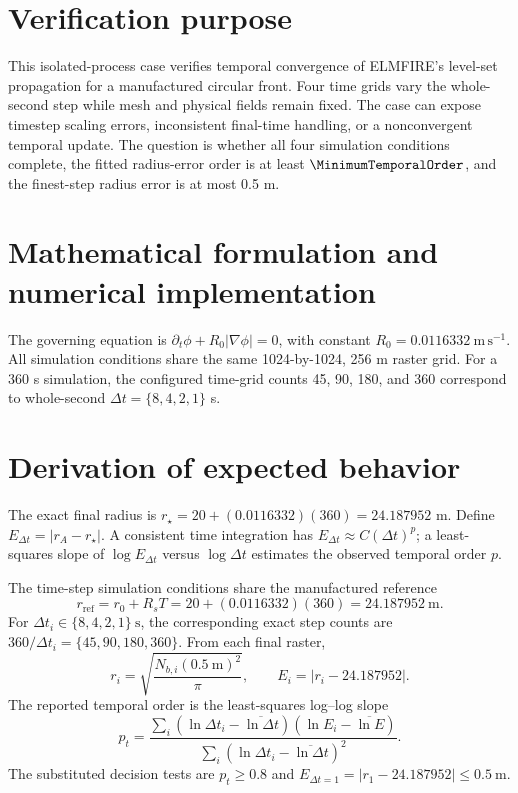 \section{Verification purpose}

This isolated-process case verifies temporal convergence of ELMFIRE's level-set propagation for a manufactured circular front. Four time grids vary the whole-second step while mesh and physical fields remain fixed. The case can expose timestep scaling errors, inconsistent final-time handling, or a nonconvergent temporal update. The question is whether all four simulation conditions complete, the fitted radius-error order is at least \(\MinimumTemporalOrder\), and the finest-step radius error is at most 0.5 m.

\section{Mathematical formulation and numerical implementation}

The governing equation is \(\partial_t\phi+R_0|\nabla\phi|=0\), with constant \(R_0=0.0116332~\mathrm{m\,s^{-1}}\). All simulation conditions share the same 1024-by-1024, 256 m raster grid. For a 360 s simulation, the configured time-grid counts 45, 90, 180, and 360 correspond to whole-second \(\Delta t=\{8,4,2,1\}\) s.

\section{Derivation of expected behavior}

The exact final radius is \(r_\star=20+(0.0116332)(360)=24.187952\) m. Define \(E_{\Delta t}=|r_A-r_\star|\). A consistent time integration has \(E_{\Delta t}\approx C(\Delta t)^p\); a least-squares slope of \(\log E_{\Delta t}\) versus \(\log\Delta t\) estimates the observed temporal order \(p\).

The time-step simulation conditions share the manufactured reference
\[
 r_{\mathrm{ref}}=r_0+R_sT
 =20+(0.0116332)(360)=24.187952~\mathrm{m}.
\]
For \(\Delta t_i\in\{8,4,2,1\}~\mathrm{s}\), the corresponding exact step
counts are \(360/\Delta t_i=\{45,90,180,360\}\).  From each final raster,
\[
 r_i=\sqrt{\frac{N_{b,i}(0.5~\mathrm{m})^2}{\pi}},\qquad
 E_i=|r_i-24.187952|.
\]
The reported temporal order is the least-squares log--log slope
\[
 p_t=\frac{\sum_i(\ln\Delta t_i-\overline{\ln\Delta t})
                    (\ln E_i-\overline{\ln E})}
              {\sum_i(\ln\Delta t_i-\overline{\ln\Delta t})^2}.
\]
The substituted decision tests are \(p_t\geq0.8\) and
\(E_{\Delta t=1}=|r_1-24.187952|\leq0.5~\mathrm{m}\).

